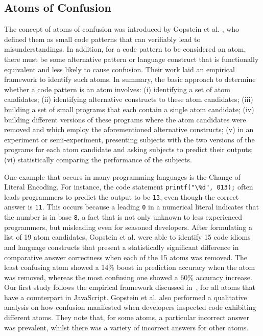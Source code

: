 \subsection{Atoms of Confusion}\label{sec:aoc}

The concept of atoms of confusion was introduced by Gopstein et al. \cite{DBLP:conf/msr/GopsteinZFC18}, who defined them as small code patterns that can verifiably lead to misunderstandings. In addition, for a code pattern to be considered an atom, there must be some alternative pattern or language construct that is functionally equivalent and less likely to cause confusion. Their work laid an empirical framework to identify such atoms. In summary, the basic approach to determine whether a code pattern is an atom involves: (i) identifying a set of atom candidates; (ii) identifying alternative constructs to these atom candidates; (iii) building a set of small programs that each contain a single atom candidate; (iv) building different versions of these programs where the atom candidates were removed and which employ the aforementioned alternative constructs; (v) in an experiment or semi-experiment, presenting subjects with the two versions of the programs for each atom candidate and asking subjects to predict their outputs; (vi) statistically comparing the performance of the subjects.

One example that occurs in many programming languages is the Change of Literal Encoding. For instance, the \clang code statement \lstinline{printf("\%d", 013);} 
often leads programmers to predict the output to be \texttt{13}, even though the correct answer is \texttt{11}. This occurs because a leading \texttt{0} in a numerical literal indicates that the number is in base \texttt{8}, a fact that is not only unknown to less experienced programmers, but misleading even for seasoned developers. After formulating a list of 19 atom candidates, Gopstein et al. \cite{DBLP:conf/sigsoft/GopsteinIYDZYC17} were able to identify 15 code idioms and language constructs that present a statistically significant difference in comparative answer correctness when each of the 15 atoms was removed. The least confusing atom showed a 14\% boost in prediction accuracy when the atom was removed, whereas the most confusing one showed a 60\% accuracy increase. Our first study follows the empirical framework discussed in~\cite{DBLP:conf/sigsoft/GopsteinIYDZYC17}, for all atoms that have a counterpart in JavaScript. Gopstein et al. \cite{DBLP:conf/msr/GopsteinZFC18} also performed a qualitative analysis on how confusion manifested when developers inspected code exhibiting different atoms. They note that, for some atoms, a particular incorrect answer was prevalent, whilst there was a variety of incorrect answers for other atoms. 

